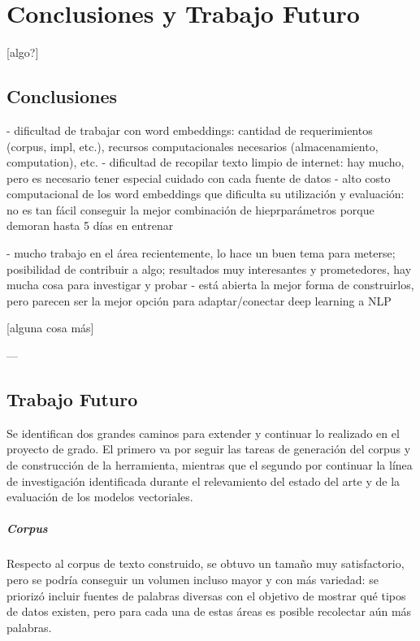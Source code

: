 \chapter{Conclusiones y Trabajo Futuro}

[algo?]

\section{Conclusiones}

- dificultad de trabajar con word embeddings: cantidad de requerimientos (corpus, impl, etc.), recursos computacionales necesarios (almacenamiento, computation), etc.
- dificultad de recopilar texto limpio de internet: hay mucho, pero es necesario tener especial cuidado con cada fuente de datos
- alto costo computacional de los word embeddings que dificulta su utilización y evaluación: no es tan fácil conseguir la mejor combinación de hieprparámetros porque demoran hasta 5 días en entrenar

- mucho trabajo en el área recientemente, lo hace un buen tema para meterse; posibilidad de contribuir a algo; resultados muy interesantes y prometedores, hay mucha cosa para investigar y probar
- está abierta la mejor forma de construirlos, pero parecen ser la mejor opción para adaptar/conectar deep learning a NLP

[alguna cosa más]


---
\section{Trabajo Futuro}

Se identifican dos grandes caminos para extender y continuar lo realizado en el proyecto de
grado. El primero va por seguir las tareas de generación del corpus y de construcción de la
herramienta, mientras que el segundo por continuar la línea de investigación identificada durante el
relevamiento del estado del arte y de la evaluación de los modelos vectoriales.


\paragraph{Corpus}

Respecto al corpus de texto construido, se obtuvo un tamaño muy satisfactorio, pero se podría
conseguir un volumen incluso mayor y con más variedad: se priorizó incluir fuentes de palabras
diversas con el objetivo de mostrar qué tipos de datos existen, pero para cada una de estas áreas es
posible recolectar aún más palabras.

